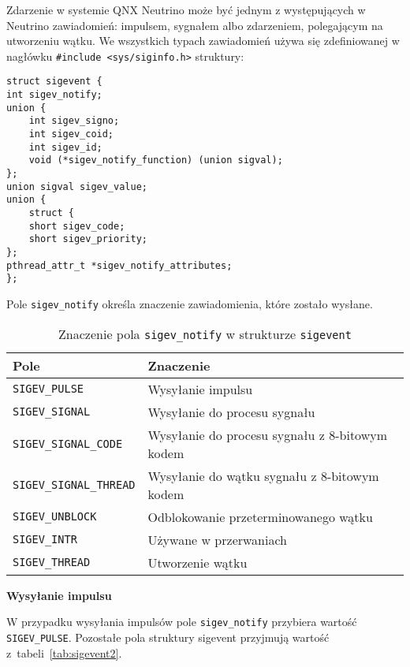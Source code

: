 Zdarzenie w systemie QNX Neutrino może być jednym z występujących w Neutrino zawiadomień: impulsem, sygnałem albo zdarzeniem, polegającym na utworzeniu wątku. We wszystkich typach zawiadomień używa się zdefiniowanej w nagłówku \lstinline[style=MyCStyle]{#include <sys/siginfo.h>} struktury: 

\begin{lstlisting}[style=MyCStyle]
struct sigevent {
int sigev_notify;
union {
	int sigev_signo;
	int sigev_coid;
	int sigev_id;
	void (*sigev_notify_function) (union sigval);
};
union sigval sigev_value;
union {
	struct {
	short sigev_code;
	short sigev_priority;
};
pthread_attr_t *sigev_notify_attributes;
};
\end{lstlisting}

Pole \lstinline[style=MyCStyle]{sigev_notify} określa znaczenie zawiadomienia, które zostało wysłane.  

\begin{table}[h!]
\centering
\caption{Znaczenie pola  \lstinline[style=MyCStyle]{sigev_notify} w strukturze  \lstinline[style=MyCStyle]{sigevent}}
\setlength{\arrayrulewidth}{1pt}
\setlength{\tabcolsep}{6pt}
\renewcommand{\arraystretch}{1.2}
\begin{tabular}{ |p{}|p{}|}
\hline \rowcolor{gray}
\textbf{Pole} & \textbf{Znaczenie} \\ \hline
\mbox{\lstinline[style=MyCStyle]{SIGEV_PULSE}} & Wysyłanie impulsu \\ \hline
\mbox{\lstinline[style=MyCStyle]{SIGEV_SIGNAL}} & Wysyłanie do procesu sygnału \\ \hline
\mbox{\lstinline[style=MyCStyle]{SIGEV_SIGNAL_CODE}} & Wysyłanie do procesu sygnału z 8-bitowym kodem \\ \hline
\mbox{\lstinline[style=MyCStyle]{SIGEV_SIGNAL_THREAD}} & Wysyłanie do wątku sygnału z 8-bitowym kodem \\ \hline
\mbox{\lstinline[style=MyCStyle]{SIGEV_UNBLOCK}} & Odblokowanie przeterminowanego wątku \\ \hline
\mbox{\lstinline[style=MyCStyle]{SIGEV_INTR}} & Używane w przerwaniach \\ \hline
\mbox{\lstinline[style=MyCStyle]{SIGEV_THREAD}} & Utworzenie wątku \\ \hline
\end{tabular}
\label{tab:sigevent}
\end{table}

\noindent 
\textbf{Wysyłanie impulsu}

W przypadku wysyłania impulsów pole \lstinline[style=MyCStyle]{sigev_notify} przybiera wartość \lstinline[style=MyCStyle]{SIGEV_PULSE}. Pozostałe pola struktury sigevent przyjmują wartość z~tabeli~\ref{tab:sigevent2}. 

